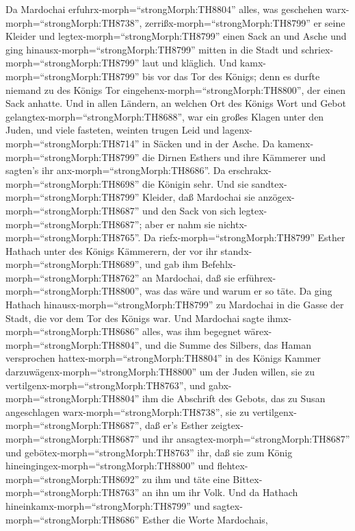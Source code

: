  Da Mardochai erfuhrx-morph=``strongMorph:TH8804'' alles,
was geschehen warx-morph=``strongMorph:TH8738'',
zerrißx-morph=``strongMorph:TH8799'' er seine Kleider und
legtex-morph=``strongMorph:TH8799'' einen Sack an und Asche und ging
hinausx-morph=``strongMorph:TH8799'' mitten in die Stadt und
schriex-morph=``strongMorph:TH8799'' laut und kläglich.  Und
kamx-morph=``strongMorph:TH8799'' bis vor das Tor des Königs; denn es
durfte niemand zu des Königs Tor eingehenx-morph=``strongMorph:TH8800'',
der einen Sack anhatte.  Und in allen Ländern, an welchen
Ort des Königs Wort und Gebot gelangtex-morph=``strongMorph:TH8688'',
war ein großes Klagen unter den Juden, und viele fasteten, weinten
trugen Leid und lagenx-morph=``strongMorph:TH8714'' in Säcken und in der
Asche.  Da kamenx-morph=``strongMorph:TH8799'' die Dirnen
Esthers und ihre Kämmerer und sagten's ihr
anx-morph=``strongMorph:TH8686''. Da
erschrakx-morph=``strongMorph:TH8698'' die Königin sehr. Und sie
sandtex-morph=``strongMorph:TH8799'' Kleider, daß Mardochai sie
anzögex-morph=``strongMorph:TH8687'' und den Sack von sich
legtex-morph=``strongMorph:TH8687''; aber er nahm sie
nichtx-morph=``strongMorph:TH8765''.  Da
riefx-morph=``strongMorph:TH8799'' Esther Hathach unter des Königs
Kämmerern, der vor ihr standx-morph=``strongMorph:TH8689'', und gab ihm
Befehlx-morph=``strongMorph:TH8762'' an Mardochai, daß sie
erführex-morph=``strongMorph:TH8800'', was das wäre und warum er so
täte.  Da ging Hathach hinausx-morph=``strongMorph:TH8799''
zu Mardochai in die Gasse der Stadt, die vor dem Tor des Königs war.
 Und Mardochai sagte ihmx-morph=``strongMorph:TH8686''
alles, was ihm begegnet wärex-morph=``strongMorph:TH8804'', und die
Summe des Silbers, das Haman versprochen
hattex-morph=``strongMorph:TH8804'' in des Königs Kammer
darzuwägenx-morph=``strongMorph:TH8800'' um der Juden willen, sie zu
vertilgenx-morph=``strongMorph:TH8763'',  und
gabx-morph=``strongMorph:TH8804'' ihm die Abschrift des Gebots, das zu
Susan angeschlagen warx-morph=``strongMorph:TH8738'', sie zu
vertilgenx-morph=``strongMorph:TH8687'', daß er's Esther
zeigtex-morph=``strongMorph:TH8687'' und ihr
ansagtex-morph=``strongMorph:TH8687'' und
gebötex-morph=``strongMorph:TH8763'' ihr, daß sie zum König
hineingingex-morph=``strongMorph:TH8800'' und
flehtex-morph=``strongMorph:TH8692'' zu ihm und täte eine
Bittex-morph=``strongMorph:TH8763'' an ihn um ihr Volk.  Und
da Hathach hineinkamx-morph=``strongMorph:TH8799'' und
sagtex-morph=``strongMorph:TH8686'' Esther die Worte Mardochais,
